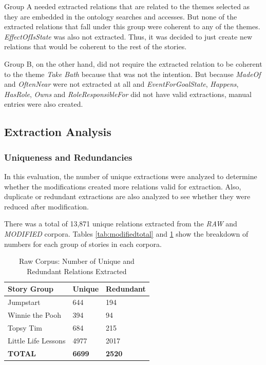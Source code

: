 Group A needed extracted relations that are related to the themes selected as they are embedded in the ontology searches and accesses. But none of the extracted relations that fall under this group were coherent to any of the themes. \textit{EffectOfIsState} was also not extracted. Thus, it was decided to just create new relations that would be coherent to the rest of the stories. 

Group B, on the other hand, did not require the extracted relation to be coherent to the theme \textit{Take Bath} because that was not the intention. But because \textit{MadeOf} and \textit{OftenNear} were not extracted at all and \textit{EventForGoalState}, \textit{Happens}, \textit{HasRole}, \textit{Owns} and \textit{RoleResponsibleFor} did not have valid extractions, manual entries were also created.

\subsection{Extraction Analysis}
\label{sec:extractionanalysis}

\subsubsection{Uniqueness and Redundancies}

In this evaluation, the number of unique extractions were analyzed to determine whether the modifications created more relations valid for extraction. Also, duplicate or redundant extractions are also analyzed to see whether they were reduced after modification.

There was a total of 13,871 unique relations extracted from the \textit{RAW} and \textit{MODIFIED} corpora. Tables \ref{tab:modifiedtotal} and \ref{tab:rawtotal} show the breakdown of numbers for each group of stories in each corpora.

\begin{table}[H]   %
\centering
\caption{Raw Corpus: Number of Unique and Redundant Relations Extracted} \vspace{0.25em}
\begin{tabular}{|p{4cm}|p{3cm}|p{3cm}|} \hline
\textbf{Story Group} & \textbf{Unique} & \textbf{Redundant} \\ \hline
Jumpstart & 644 & 194 \\ \hline
Winnie the Pooh & 394 & 94 \\ \hline
Topsy Tim & 684 & 215 \\ \hline
Little Life Lessons & 4977 & 2017 \\ \hline
\textbf{TOTAL} & \textbf{6699} & \textbf{2520} \\ \hline
\end{tabular}
\label{tab:rawtotal}
\end{table}

